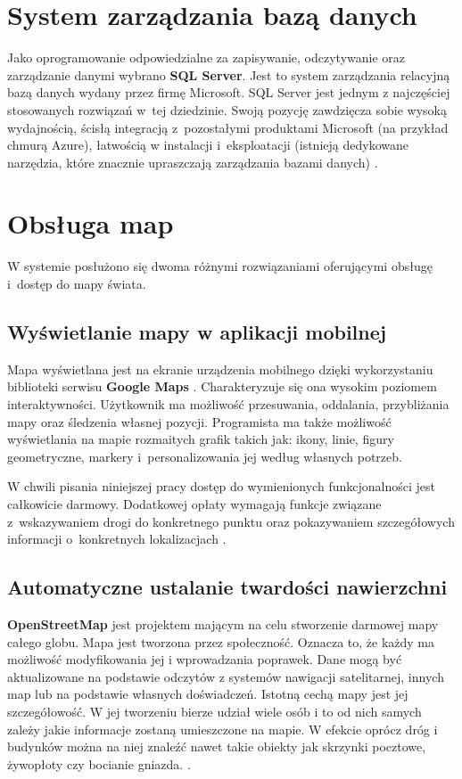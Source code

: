 \section{System zarządzania bazą danych}
Jako oprogramowanie odpowiedzialne za zapisywanie, odczytywanie oraz zarządzanie danymi wybrano \textbf{SQL Server}. Jest to system zarządzania relacyjną bazą danych wydany przez firmę Microsoft. SQL Server jest jednym z najczęściej stosowanych rozwiązań w~tej dziedzinie. Swoją pozycję zawdzięcza sobie wysoką wydajnością, ścisłą integracją z~pozostałymi produktami Microsoft (na przykład chmurą Azure), łatwością w instalacji i~eksploatacji (istnieją dedykowane narzędzia, które znacznie upraszczają zarządzania bazami danych)  \cite{ksiazka-sql}.

\section{Obsługa map}
W systemie posłużono się dwoma różnymi rozwiązaniami oferującymi obsługę i~dostęp do mapy świata.
\subsection{Wyświetlanie mapy w aplikacji mobilnej}
Mapa wyświetlana jest na ekranie urządzenia mobilnego dzięki wykorzystaniu biblioteki serwisu \textbf{Google Maps} \cite{google-maps}. Charakteryzuje się ona wysokim poziomem interaktywności. Użytkownik ma możliwość przesuwania, oddalania, przybliżania mapy oraz śledzenia własnej pozycji. Programista ma także możliwość wyświetlania na mapie rozmaitych grafik takich jak: ikony, linie, figury geometryczne, markery i~personalizowania jej według własnych potrzeb.

W chwili pisania niniejszej pracy dostęp do wymienionych funkcjonalności jest całkowicie darmowy. Dodatkowej opłaty wymagają funkcje związane z~wskazywaniem drogi do konkretnego punktu oraz pokazywaniem szczegółowych informacji o~konkretnych lokalizacjach \cite{google-maps-pricing}.
\subsection{Automatyczne ustalanie twardości nawierzchni}
\textbf{OpenStreetMap} \cite{osm} jest projektem mającym na celu stworzenie darmowej mapy całego globu. Mapa jest tworzona przez społeczność. Oznacza to, że każdy ma możliwość modyfikowania jej i wprowadzania poprawek. Dane mogą być aktualizowane na podstawie odczytów z systemów nawigacji satelitarnej, innych map lub na podstawie własnych doświadczeń. Istotną cechą mapy jest jej szczegółowość. W jej tworzeniu bierze udział wiele osób i to od nich samych zależy jakie informacje zostaną umieszczone na mapie. W efekcie oprócz dróg i budynków można na niej znaleźć nawet takie obiekty jak skrzynki pocztowe, żywopłoty czy bocianie gniazda. \cite{osm-gather-data}. 

